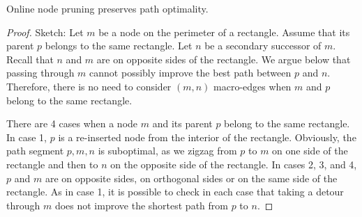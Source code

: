 \begin{lemma}
Online node pruning preserves path optimality.
\end{lemma}
\begin{proof}
Sketch: Let $m$ be a node on the perimeter of a rectangle. Assume that its
parent $p$ belongs to the same rectangle.  Let $n$ be a secondary successor of
$m$.  Recall that $n$ and $m$ are on opposite sides of the rectangle.  We argue
below that passing through $m$ cannot possibly improve the best path between $p$
and $n$.  Therefore, there is no need to consider $(m,n)$ macro-edges when $m$
and $p$ belong to the same rectangle.

There are 4 cases when a node $m$ and its parent $p$ belong to the same
rectangle. In case 1, $p$ is a re-inserted node from the interior of the
rectangle.  Obviously, the path segment $p,m,n$ is suboptimal, as we zigzag from
$p$ to $m$ on one side of the rectangle and then to $n$ on the opposite side of
the rectangle.  In cases 2, 3, and 4, $p$ and $m$ are on opposite sides, on
orthogonal sides or on the same side of the rectangle. As in case 1, it is
possible to check in each case that taking a detour through $m$ does not improve
the shortest path from $p$ to $n$.
\end{proof}



